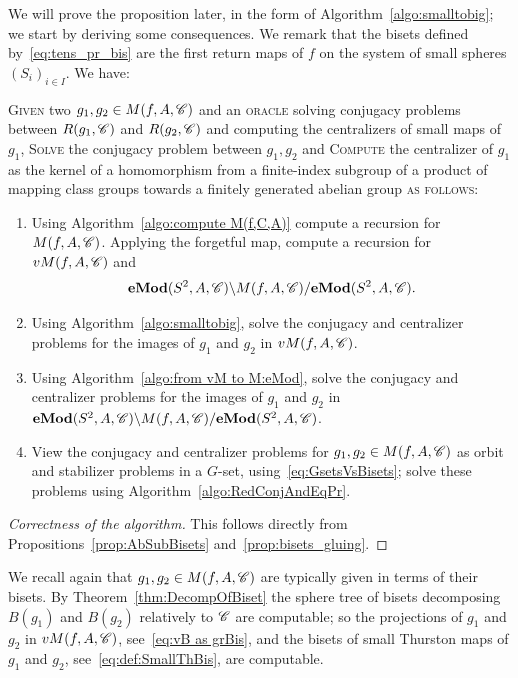 \documentclass{amsart}
\begin{document}
We will prove the proposition later, in the form of
Algorithm~\ref{algo:smalltobig}; we start by deriving some
consequences. We remark that the bisets defined
by~\eqref{eq:tens_pr_bis} are the first return maps of $f$ on the
system of small spheres $(S_i)_{i\in I}$. We have:
\begin{algo}\label{algo:bisets_decomp}
 \textsc{Given} two $g_1,g_2\in M(f,A,\CC)$ and an \textsc{oracle} solving conjugacy problems between $R(g_1,\CC)$ and $R(g_2,\CC)$ and computing the centralizers of small maps of $g_1$, \textsc{Solve} the conjugacy problem between $g_1,g_2$ and \textsc{Compute} the
  centralizer of $g_1$ as the kernel of a homomorphism from a
  finite-index subgroup of a product of mapping class groups towards a
  finitely generated abelian group
   \textsc{as follows:}\upshape
 \begin{enumerate}
 \item Using Algorithm~\ref{algo:compute M(f,C,A)} compute a recursion
   for $M(f,A,\CC)$. Applying the forgetful map, compute a recursion
   for $vM(f,A,\CC)$ and
   \[\Mod[e](S^2,A,\CC)\backslash M(f,A,\CC)/\Mod[e](S^2,A,\CC).\]
\item Using Algorithm~\ref{algo:smalltobig}, solve the conjugacy and
  centralizer problems for the images of $g_1$ and $g_2$ in
  $vM(f,A,\CC)$.
 \item Using Algorithm~\ref{algo:from vM to M:eMod}, solve the
   conjugacy and centralizer problems for the images of $g_1$ and
   $g_2$ in
   $\Mod[e](S^2,A,\CC)\backslash M(f,A,\CC)/\Mod[e](S^2,A,\CC)$.
 \item View the conjugacy and centralizer problems for
   $g_1,g_2\in M(f,A,\CC)$ as orbit and stabilizer problems in a
   $G$-set, using~\eqref{eq:GsetsVsBisets}; solve these problems using
   Algorithm~\ref{algo:RedConjAndEqPr}.
 \end{enumerate}
\end{algo}
\begin{proof}[Correctness of the algorithm]
  This follows directly from Propositions~\ref{prop:AbSubBisets}
  and~\ref{prop:bisets_gluing}.
\end{proof}

We recall again that $g_1,g_2\in M(f,A,\CC)$ are typically given in
terms of their bisets. By Theorem~\ref{thm:DecompOfBiset} the sphere
tree of bisets decomposing $B(g_1)$ and $B(g_2)$ relatively to $\CC$
are computable; so the projections of $g_1$ and $g_2$ in
$vM(f,A,\CC)$, see~\eqref{eq:vB as grBis}, and the bisets of small
Thurston maps of $g_1$ and $g_2$, see~\eqref{eq:def:SmallThBis}, are
computable.
\end{document}
